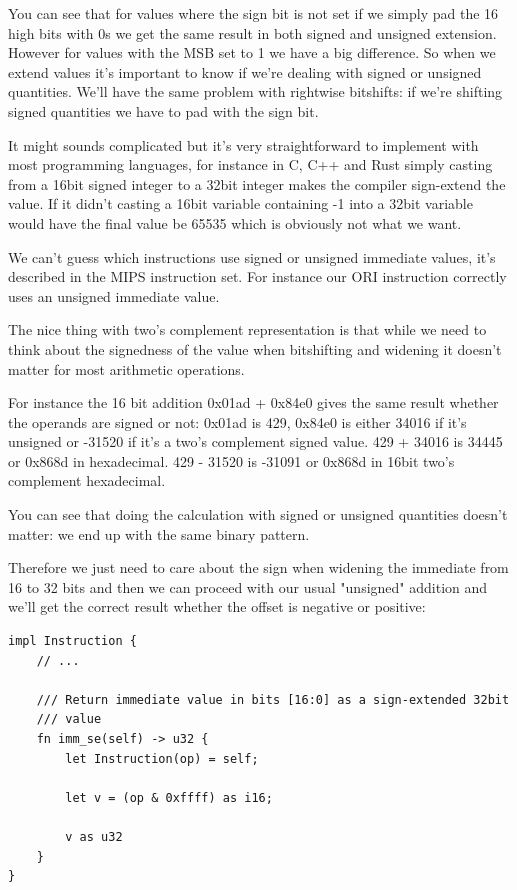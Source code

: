 \documentclass[a4paper]{article}
\begin{document}
You can see that for values where the sign bit is not set if we simply
pad the 16 high bits with 0s we get the same result in both signed and
unsigned extension. However for values with the MSB set to 1 we have a
big difference. So when we extend values it's important to know if
we're dealing with signed or unsigned quantities. We'll have the same
problem with rightwise bitshifts: if we're shifting signed quantities
we have to pad with the sign bit.

It might sounds complicated but it's very straightforward to implement
with most programming languages, for instance in C, C++ and Rust
simply casting from a 16bit signed integer to a 32bit integer makes
the compiler sign-extend the value. If it didn't casting a 16bit
variable containing -1 into a 32bit variable would have the final
value be 65535 which is obviously not what we want.

We can't guess which instructions use signed or unsigned immediate
values, it's described in the MIPS instruction set. For instance our
ORI instruction correctly uses an unsigned immediate value.

The nice thing with two's complement representation is that while we
need to think about the signedness of the value when bitshifting and
widening it doesn't matter for most arithmetic operations.

For instance the 16 bit addition 0x01ad + 0x84e0 gives the same result
whether the operands are signed or not: 0x01ad is 429, 0x84e0 is
either 34016 if it's unsigned or -31520 if it's a two's complement
signed value. 429 + 34016 is 34445 or 0x868d in hexadecimal. 429 -
31520 is -31091 or 0x868d in 16bit two's complement hexadecimal.

You can see that doing the calculation with signed or unsigned
quantities doesn't matter: we end up with the same binary pattern.

Therefore we just need to care about the sign when widening the
immediate from 16 to 32 bits and then we can proceed with our usual
"unsigned" addition and we'll get the correct result whether the
offset is negative or positive:

\begin{lstlisting}
impl Instruction {
    // ...

    /// Return immediate value in bits [16:0] as a sign-extended 32bit
    /// value
    fn imm_se(self) -> u32 {
        let Instruction(op) = self;

        let v = (op & 0xffff) as i16;

        v as u32
    }
}
\end{lstlisting}
\end{document}
